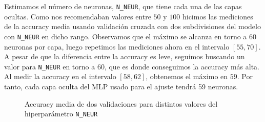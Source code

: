 \documentclass[a4]{article}
\begin{document}
Estimamos el número de neuronas, \texttt{N\_NEUR}, que tiene cada una
de las capas ocultas. Como nos recomendaban valores entre $50$ y $100$
hicimos las mediciones de la accuracy media usando validación cruzada
con dos subdivisiones del modelo con \texttt{N\_NEUR} en dicho
rango. Observamos que el máximo se alcanza en torno a $60$ neuronas
por capa, luego repetimos las mediciones ahora en el intervalo
$[55,70]$. A pesar de que la diferencia entre la accuracy es leve,
seguimos buscando un valor para \texttt{N\_NEUR} en torno a $60$, que
es donde conseguimos la accuracy más alta. Al medir la accuracy en el
intervalo $[58,62]$, obtenemos el máximo en $59$. Por tanto, cada capa
oculta del MLP usado para el ajuste tendrá 59 neuronas.

\begin{figure}[H]
  \centering
  \caption{Accuracy media de dos validaciones para distintos valores del hiperparámetro \texttt{N\_NEUR}}
  \label{fig:HyperparametersRF}
\end{figure}
\end{document}

